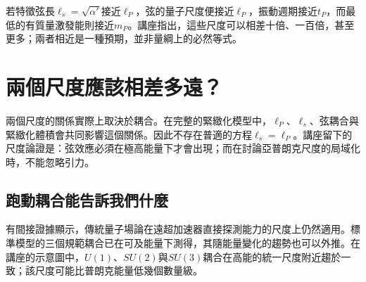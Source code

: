 若特徵弦長\(\ell_s=\sqrt{\alpha'}\)接近\(\ell_P\)，弦的量子尺度便接近\(\ell_P\)，振動週期接近\(t_P\)，而最低的有質量激發能則接近\(m_P\)。講座指出，這些尺度可以相差十倍、一百倍，甚至更多；兩者相近是一種預期，並非量綱上的必然等式。

\begin{classroomqa}
\end{classroomqa}

\section{兩個尺度應該相差多遠？}

\begin{classroomqa}
\end{classroomqa}

兩個尺度的關係實際上取決於耦合。在完整的緊緻化模型中，\(\ell_P\)、\(\ell_s\)、弦耦合與緊緻化體積會共同影響這個關係。因此不存在普適的方程\(\ell_s=\ell_P\)。講座留下的尺度論證是：弦效應必須在極高能量下才會出現；而在討論亞普朗克尺度的局域化時，不能忽略引力。

\begin{classroomqa}
\end{classroomqa}

\subsection{跑動耦合能告訴我們什麼}

有間接證據顯示，傳統量子場論在遠超加速器直接探測能力的尺度上仍然適用。標準模型的三個規範耦合已在可及能量下測得，其隨能量變化的趨勢也可以外推。在講座的示意圖中，\(U(1)\)、\(SU(2)\)與\(SU(3)\)耦合在高能的統一尺度附近趨於一致；該尺度可能比普朗克能量低幾個數量級。

